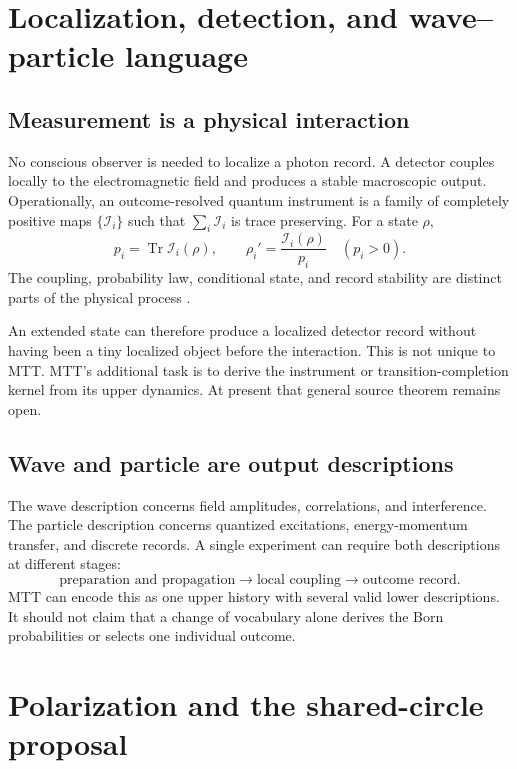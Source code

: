 \documentclass[11pt,a4paper]{article}
\numberwithin{equation}{section}
\theoremstyle{definition}
\theoremstyle{remark}
\newcommand{\cI}{\mathcal I}
\begin{document}
\section{Localization, detection, and wave--particle language}

\subsection{Measurement is a physical interaction}

No conscious observer is needed to localize a photon record.  A detector
couples locally to the electromagnetic field and produces a stable
macroscopic output.  Operationally, an outcome-resolved quantum
instrument is a family of completely positive maps
\(\{\cI_i\}\) such that \(\sum_i\cI_i\) is trace preserving.  For a state
\(\rho\),
\[
p_i=\operatorname{Tr}\cI_i(\rho),\qquad
\rho_i'=\frac{\cI_i(\rho)}{p_i}
\quad(p_i>0).
\]
The coupling, probability law, conditional state, and record stability
are distinct parts of the physical process \cite{DaviesLewis1970,NeroMeasurement2026}.

An extended state can therefore produce a localized detector record
without having been a tiny localized object before the interaction.
This is not unique to MTT.  MTT's additional task is to derive the
instrument or transition-completion kernel from its upper dynamics.
At present that general source theorem remains open.

\subsection{Wave and particle are output descriptions}

The wave description concerns field amplitudes, correlations, and
interference.  The particle description concerns quantized excitations,
energy-momentum transfer, and discrete records.  A single experiment can
require both descriptions at different stages:
\[
\text{preparation and propagation}
\longrightarrow
\text{local coupling}
\longrightarrow
\text{outcome record}.
\]
MTT can encode this as one upper history with several valid lower
descriptions.  It should not claim that a change of vocabulary alone
derives the Born probabilities or selects one individual outcome.

\section{Polarization and the shared-circle proposal}
\end{document}
